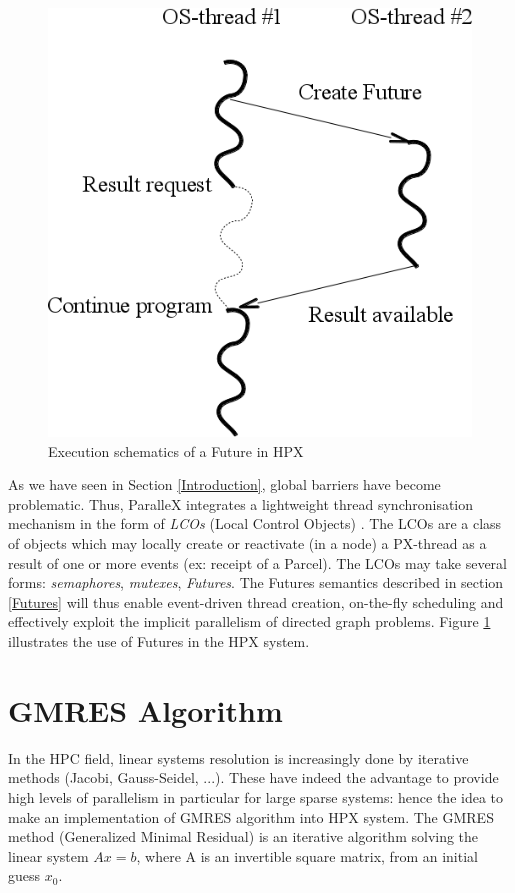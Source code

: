 \documentclass{llncs}
\begin{document}
\begin{figure}[h]
\begin{center}
\includegraphics[scale=0.4]{Images/Im5.png}
\end{center}
\caption{Execution schematics of a Future in HPX}
\label{hpxthread}
\end{figure}

As we have seen in Section \ref{Introduction}, global barriers have become problematic. Thus, ParalleX integrates a lightweight thread synchronisation
mechanism in the form of \emph{LCOs} (Local Control Objects) \cite{ParalleX}. The LCOs are a class of objects which may locally create or reactivate (in a node) a PX-thread as a result of one or more events (ex: receipt of a Parcel). The LCOs may take several forms: \emph{semaphores}, \emph{mutexes}, \emph{Futures}. The Futures semantics described in section \ref{Futures} will thus enable event-driven thread creation, on-the-fly scheduling and effectively exploit the implicit parallelism of directed graph problems. Figure \ref{hpxthread} illustrates the use of Futures in the HPX system.

\section{GMRES Algorithm}\label{GMRES}
In the HPC field, linear systems resolution is increasingly done by iterative methods \cite{Methodes} (Jacobi, Gauss-Seidel, ...). These have indeed the advantage to provide high levels of parallelism in particular for large sparse systems: hence the idea to make an implementation of GMRES algorithm into HPX system. The GMRES method (Generalized Minimal Residual) \cite{GMRES} is an iterative algorithm solving the linear system $Ax=b$, where A is an invertible square matrix, from an initial guess $x_{0}$.\smallskip
\end{document}
